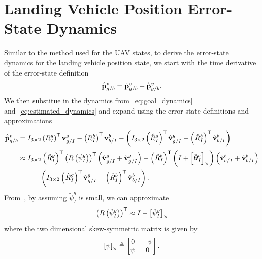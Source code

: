 \section{Landing Vehicle Position Error-State Dynamics}
Similar to the method used for the UAV states, to derive the error-state
dynamics for the landing vehicle position state, we start with the time
derivative of the error-state definition
\begin{equation}
  \dot{\tilde{\boldsymbol{\mathrm{p}}}}_{g/b}^{v} = \dot{\boldsymbol{\mathrm{p}}}_{g/b}^{v} -
  \dot{\hat{\boldsymbol{\mathrm{p}}}}_{g/b}^{v}.
\end{equation}
We then substitue in the dynamics from~\eqref{eq:goal_dynamics}
and~\eqref{eq:estimated_dynamics} and expand using the error-state definitions
and approximations
\begin{align}
  \dot{\tilde{\boldsymbol{\mathrm{p}}}}_{g/b}^{v}
  &=
  I_{3 \times 2} \left( R_{I}^{g} \right)^{\mathsf{T}}
  \boldsymbol{\mathrm{v}}_{g/I}^{g} - \left( R_{I}^{b} \right)^{\mathsf{T}}
  \boldsymbol{\mathrm{v}}_{b/I}^{b}
  -
  \left(
  I_{3 \times 2} \left( \hat{R}_{I}^{g} \right)^{\mathsf{T}}
  \hat{\boldsymbol{\mathrm{v}}}_{g/I}^{g} - \left( \hat{R}_{I}^{b} \right)^{\mathsf{T}}
  \hat{\boldsymbol{\mathrm{v}}}_{b/I}^{b}
  \right) \\
  &\approx
  \label{eq:goal_pos_err_state1}
  I_{3 \times 2} \left( \hat{R}_{I}^{g} \right)^{\mathsf{T}}
  \left( R \left( \tilde{\psi}_{I}^{g} \right) \right)^{\mathsf{T}}
  \left( \hat{\boldsymbol{\mathrm{v}}}_{g/I}^{g} + \tilde{\boldsymbol{\mathrm{v}}}_{g/I}^{g} \right) - \left(
  \hat{R}_{I}^{b} \right)^{\mathsf{T}}
  \left( I + \left[ \tilde{\boldsymbol{\mathrm{\theta}}}_I^b \right]_{\times} \right)
  \left( \hat{\boldsymbol{\mathrm{v}}}_{b/I}^{b} + \tilde{\boldsymbol{\mathrm{v}}}_{b/I}^{b} \right) \\
  & \qquad -
  \left(
  I_{3 \times 2} \left( \hat{R}_{I}^{g} \right)^{\mathsf{T}}
  \hat{\boldsymbol{\mathrm{v}}}_{g/I}^{g} - \left( \hat{R}_{I}^{b} \right)^{\mathsf{T}}
  \hat{\boldsymbol{\mathrm{v}}}_{b/I}^{b}
  \right). \nonumber
\end{align}
From~\cite{sola2018micro}, by assuming $\tilde{\psi}_I^g$ is small, we can approximate 
\begin{equation}
  \left( R \left( \tilde{\psi}_I^g \right) \right)^{\mathsf{T}} \approx I -
  \left[ \tilde{\psi}_I^g \right]_{\times}
  \label{eq:2d_err_rot_approx}
\end{equation}
where the two dimensional skew-symmetric matrix is given by
\begin{equation}
  \left[ \psi \right]_{\times} \triangleq
  \begin{bmatrix}
    0 & -\psi \\
    \psi & 0
  \end{bmatrix}.
\end{equation}
